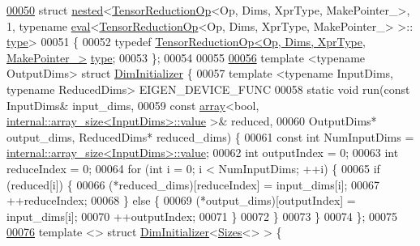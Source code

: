 \begin{DoxyCode}
\hyperlink{struct_eigen_1_1internal_1_1nested_3_01_tensor_reduction_op_3_01_op_00_01_dims_00_01_xpr_type_003b0e9bfd65794f3be6d0916aaf050d6d}{00050} \textcolor{keyword}{struct }\hyperlink{struct_eigen_1_1internal_1_1nested}{nested}<\hyperlink{class_eigen_1_1_tensor_reduction_op}{TensorReductionOp}<Op, Dims, XprType, MakePointer\_>, 1, typename 
      \hyperlink{struct_eigen_1_1internal_1_1eval}{eval}<\hyperlink{class_eigen_1_1_tensor_reduction_op}{TensorReductionOp}<Op, Dims, XprType, MakePointer\_> >::
      \hyperlink{class_eigen_1_1_tensor_reduction_op}{type}>
00051 \{
00052   \textcolor{keyword}{typedef} \hyperlink{class_eigen_1_1_tensor_reduction_op}{TensorReductionOp<Op, Dims, XprType, MakePointer\_>}
       \hyperlink{class_eigen_1_1_tensor_reduction_op}{type};
00053 \};
00054 
00055 
\hyperlink{struct_eigen_1_1internal_1_1_dim_initializer}{00056} \textcolor{keyword}{template} <\textcolor{keyword}{typename} OutputDims> \textcolor{keyword}{struct }\hyperlink{struct_eigen_1_1internal_1_1_dim_initializer}{DimInitializer} \{
00057   \textcolor{keyword}{template} <\textcolor{keyword}{typename} InputDims, \textcolor{keyword}{typename} ReducedDims> EIGEN\_DEVICE\_FUNC
00058   \textcolor{keyword}{static} \textcolor{keywordtype}{void} run(\textcolor{keyword}{const} InputDims& input\_dims,
00059                   \textcolor{keyword}{const} \hyperlink{class_eigen_1_1array}{array}<\textcolor{keywordtype}{bool}, \hyperlink{struct_eigen_1_1internal_1_1array__size}{internal::array\_size<InputDims>::value}
      >& reduced,
00060                   OutputDims* output\_dims, ReducedDims* reduced\_dims) \{
00061     \textcolor{keyword}{const} \textcolor{keywordtype}{int} NumInputDims = \hyperlink{struct_eigen_1_1internal_1_1array__size}{internal::array\_size<InputDims>::value};
00062     \textcolor{keywordtype}{int} outputIndex = 0;
00063     \textcolor{keywordtype}{int} reduceIndex = 0;
00064     \textcolor{keywordflow}{for} (\textcolor{keywordtype}{int} i = 0; i < NumInputDims; ++i) \{
00065       \textcolor{keywordflow}{if} (reduced[i]) \{
00066         (*reduced\_dims)[reduceIndex] = input\_dims[i];
00067         ++reduceIndex;
00068       \} \textcolor{keywordflow}{else} \{
00069         (*output\_dims)[outputIndex] = input\_dims[i];
00070         ++outputIndex;
00071       \}
00072     \}
00073   \}
00074 \};
00075 
\hyperlink{struct_eigen_1_1internal_1_1_dim_initializer_3_01_sizes_3_4_01_4}{00076} \textcolor{keyword}{template} <> \textcolor{keyword}{struct }\hyperlink{struct_eigen_1_1internal_1_1_dim_initializer}{DimInitializer}<\hyperlink{struct_eigen_1_1_sizes}{Sizes}<> > \{

\end{DoxyCode}
